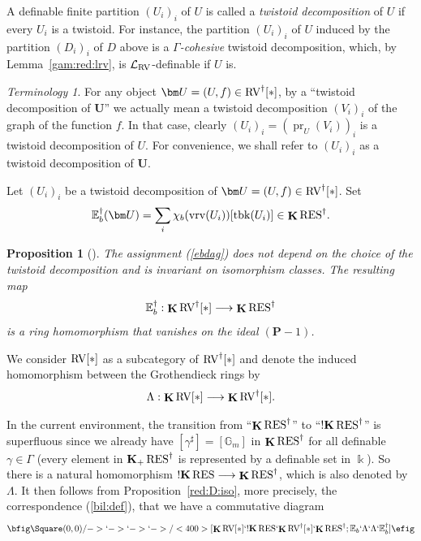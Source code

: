 \documentclass[12pt]{amsart}
\newcommand{\memph}[1]{{\color{magenta}\emph{#1}}}
\theoremstyle{plain}
\newtheorem{prop}[thm]{Proposition}
\theoremstyle{definition}
\theoremstyle{remark}
\newtheorem{ter}[thm]{Terminology}
\numberwithin{equation}{section}
\theoremstyle{plain}
\newcommand{\RV}{\textup{RV}}
\DeclareMathOperator{\pr}{pr}
\DeclareMathOperator{\K}{\mathds{k}}
\newcommand{\G}{\mathds{G}}
\newcommand{\0}{\emptyset}
\newcommand{\lan}[3]{\mathcal{L}_{#1 \textup{#2} #3}}
\newcommand{\bb}[1]{\mathbb{#1}}
\newcommand{\fun}{\longrightarrow}
\newcommand{\RES}{\textup{RES}}
\DeclareMathOperator{\gsk}{\mathbf{K}_+}
\DeclareMathOperator{\ggk}{\mathbf{K}}
\DeclareMathOperator{\sggk}{!\mathbf{K}}
\DeclareMathOperator{\vrv}{vrv}
\DeclareMathOperator{\tbk}{tbk}
\begin{document}
A definable finite partition $(U_i)_i$ of $U$ is called a \memph{twistoid decomposition} of $U$ if every $U_i$ is a twistoid. For instance,  the partition $(U_i)_i$ of $U$ induced by the partition $(D_i)_i$ of $D$ above is a \memph{$\Gamma$-cohesive} twistoid decomposition, which, by Lemma~\ref{gam:red:lrv}, is  $\lan{}{RV}{}$-definable if $U$ is.

\begin{ter}\label{twist:rv:ob}
For any object $\bm U = (U, f) \in \RV^\dag[*]$, by a ``twistoid decomposition of $\bm U$'' we actually mean a twistoid decomposition $(V_i)_i$ of the graph of the function $f$. In that case, clearly $(U_i)_i = (\pr_U(V_i))_i$ is a twistoid decomposition of $U$. For convenience, we shall refer to $(U_i)_i$ as a twistoid decomposition of $\bm U$.
\end{ter}


Let  $(U_i)_i$ be a twistoid decomposition of $\bm U = (U, f) \in \RV^\dag[*]$. Set
\begin{equation}\label{ebdag}
 \bb E^\dag_b(\bm U) = \sum_i \chi_b(\vrv(U_i))[\tbk(U_i)] \in \ggk \RES^\dag.
\end{equation}

\begin{prop}[{\cite[Propositions~3.21, 3.30]{Yin:int:expan:acvf}}]
The assignment (\ref{ebdag}) does not depend on the choice of the twistoid decomposition  and is invariant on isomorphism classes. The resulting map
\[
\bb E^\dag_b : \ggk \RV^\dag[*] \fun \ggk \RES^\dag
\]
is a ring homomorphism that vanishes on the ideal $(\bm P - 1)$.
\end{prop}

We consider $\RV[*]$ as a subcategory of $\RV^\dag[*]$ and denote the induced homomorphism between the Grothendieck rings by
\[
\Lambda : \ggk\RV[*] \fun \ggk\RV^\dag[*].
\]


In the current environment, the transition from ``$\ggk \RES^\dag$'' to ``$\sggk \RES^\dag$'' is superfluous since we already have $[\gamma^\sharp] = [\G_m]$ in $\ggk \RES^\dag$ for all definable $\gamma \in \Gamma$ (every element in  $\gsk \RES^\dag$ is represented by a definable set in $\K$). So there is a natural homomorphism  $\sggk \RES \fun \ggk \RES^\dag$, which is also denoted by $\Lambda$. It then follows from  Proposition~\ref{red:D:iso}, more precisely, the correspondence (\ref{bil:def}), that we have a commutative diagram
\begin{equation}\label{dag:red}
\bfig
\Square(0,0)/->`->`->`->/<400>[{\ggk \RV[*]}`{\sggk \RES}`{\ggk \RV^\dag[*]}`{\ggk \RES^\dag}; \bb E_b`\Lambda`\Lambda`{\bb E^\dag_b}]
\efig
\end{equation}
\end{document}
